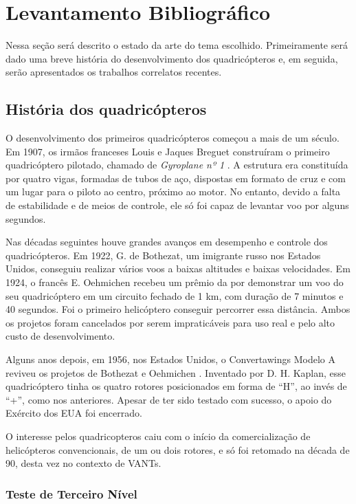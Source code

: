 \chapter{Levantamento Bibliográfico} \label{cap:funda}

Nessa seção será descrito o estado da arte do tema escolhido. Primeiramente será dado uma breve história do desenvolvimento dos quadricópteros e, em seguida, serão apresentados os trabalhos correlatos recentes.

\section{História dos quadricópteros}

O desenvolvimento dos primeiros quadricópteros começou a mais de um século. Em 1907, os irmãos franceses Louis e Jaques Breguet construíram o primeiro quadricóptero pilotado, chamado de \textit{Gyroplane nº 1} \cite{leishman00}. A estrutura era constituída por quatro vigas, formadas de tubos de aço, dispostas em formato de cruz e com um lugar para o piloto ao centro, próximo ao motor. No entanto, devido a falta de estabilidade e de meios de controle, ele só foi capaz de levantar voo por alguns segundos.

Nas décadas seguintes houve grandes avanços em desempenho e controle dos quadricópteros. Em 1922, G. de Bothezat, um imigrante russo nos Estados Unidos, conseguiu realizar vários voos a baixas altitudes e baixas velocidades. Em 1924, o francês E. Oehmichen recebeu um prêmio da  por demonstrar um voo do seu quadricóptero em um circuito fechado de 1 km, com duração de 7 minutos e 40 segundos. Foi o primeiro helicóptero conseguir percorrer essa distância. Ambos os projetos foram cancelados por serem impraticáveis para uso real e pelo alto custo de desenvolvimento.

Alguns anos depois, em 1956, nos Estados Unidos, o Convertawings Modelo A reviveu os projetos de Bothezat e Oehmichen \cite{lambermont58}. Inventado por D. H. Kaplan, esse quadricóptero tinha os quatro rotores posicionados em forma de ``H'', ao invés de ``+'', como nos anteriores. Apesar de ter sido testado com sucesso, o apoio do Exército dos EUA foi encerrado.

O interesse pelos quadricopteros caiu com o início da comercialização de helicópteros convencionais, de um ou dois rotores, e só foi retomado na década de 90, desta vez no contexto de VANTs.

\subsection{Teste de Terceiro Nível}


